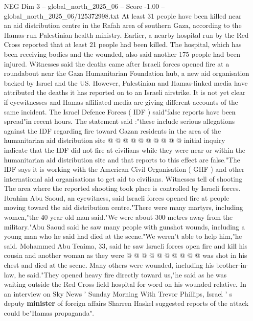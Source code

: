 \begin{textsample}{NEG Dim 3 – global\_north\_2025\_06 – Score -1.00 – global\_north\_2025\_06/125372998.txt}  \label{ex:f3_neg_354}
At least 31 people have been killed near an aid distribution centre in the Rafah area of southern Gaza, according to the Hamas-run Palestinian health ministry.
Earlier, a nearby hospital run by the Red Cross reported that at least 21 people had been killed.
The hospital, which has been receiving bodies and the wounded, also said another 175 people had been injured.
Witnesses said the deaths came after Israeli forces opened fire at a roundabout near the Gaza Humanitarian Foundation hub, a new aid organisation backed by Israel and the US.
However, Palestinian and Hamas-linked media have attributed the deaths it has reported on to an Israeli airstrike.
It is not yet clear if eyewitnesses and Hamas-affiliated media are giving different accounts of the same incident.
The Israel Defence Forces ( IDF ) said"false reports have been spread"in recent hours.
The statement said :"these include serious allegations against the IDF regarding fire toward Gazan residents in the area of the humanitarian aid distribution site @ @ @ @ @ @ @ @ @ @ initial inquiry indicate that the IDF did not fire at civilians while they were near or within the humanitarian aid distribution site and that reports to this effect are false."The IDF says it is working with the American Civil Organisation ( GHF ) and other international aid organisations to get aid to civilians.
Witnesses tell of shooting The area where the reported shooting took place is controlled by Israeli forces.
Ibrahim Abu Saoud, an eyewitness, said Israeli forces opened fire at people moving toward the aid distribution centre."There were many martyrs, including women,"the 40-year-old man said."We were about 300 metres away from the military."Abu Saoud said he saw many people with gunshot wounds, including a young man who he said had died at the scene."We weren't able to help him,"he said.
Mohammed Abu Teaima, 33, said he saw Israeli forces open fire and kill his cousin and another woman as they were @ @ @ @ @ @ @ @ @ @ was shot in his chest and died at the scene.
Many others were wounded, including his brother-in-law, he said."They opened heavy fire directly toward us,"he said as he was waiting outside the Red Cross field hospital for word on his wounded relative.
In an interview on Sky News ' Sunday Morning With Trevor Phillips, Israel ' s deputy \textbf{minister} of foreign affairs Sharren Haskel suggested reports of the attack could be"Hamas propaganda".

\end{textsample}
